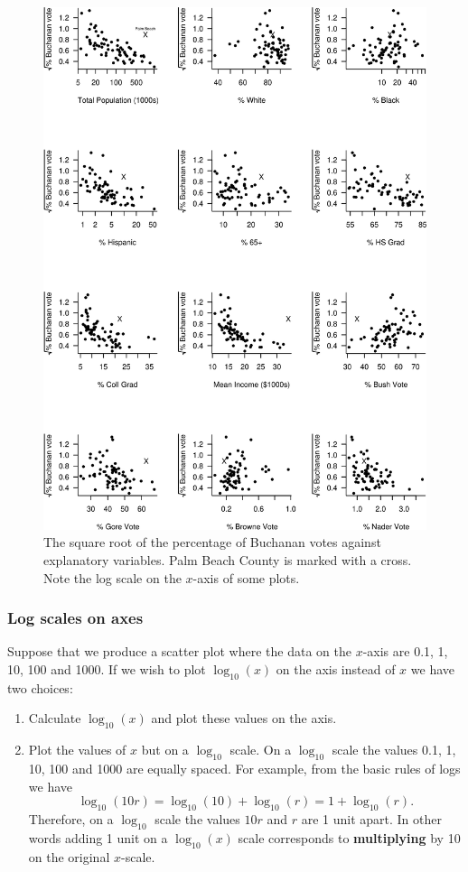 \documentclass[
  british,
]{book}
\providecommand{\tightlist}{%
  \setlength{\itemsep}{0pt}\setlength{\parskip}{0pt}}
\begin{document}
\begin{figure}

{\centering \includegraphics[width=0.8\linewidth]{images/election2} 

}

\caption{The square root of the percentage of Buchanan votes against explanatory variables.  Palm Beach County is marked with a cross.  Note the log scale on the $x$-axis of some plots.}\label{fig:election2}
\end{figure}
\FloatBarrier

\hypertarget{log-scales-on-axes}{%
\subsubsection*{Log scales on axes}\label{log-scales-on-axes}}

Suppose that we produce a scatter plot where the data on the \(x\)-axis are 0.1, 1, 10, 100 and 1000. If we wish to plot \(\log_{10}(x)\) on the axis instead of \(x\) we have two choices:

\begin{enumerate}
\def\labelenumi{(\alph{enumi})}
\tightlist
\item
  Calculate \(\log_{10}(x)\) and plot these values on the axis.
\item
  Plot the values of \(x\) but on a \(\log_{10}\) scale. On a \(\log_{10}\) scale the values 0.1, 1, 10, 100 and 1000 are equally spaced. For example, from the basic rules of logs we have
  \[\log_{10}(10r) = \log_{10}(10)+\log_{10}(r)=1+\log_{10}(r).\]
  Therefore, on a \(\log_{10}\) scale the values \(10r\) and \(r\) are 1 unit apart. In other words adding 1 unit on a \(\log_{10}(x)\) scale corresponds to \textbf{multiplying} by 10 on the original \(x\)-scale.
\end{enumerate}
\end{document}
